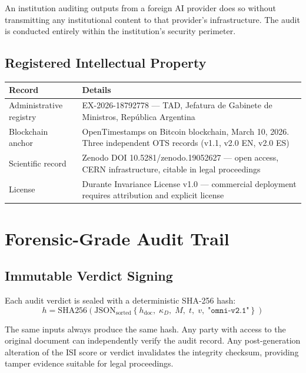 \documentclass[11pt, a4paper]{article}
\begin{document}
An institution auditing outputs from a foreign AI provider does so without
transmitting any institutional content to that provider's infrastructure.
The audit is conducted entirely within the institution's security perimeter.

\subsection{Registered Intellectual Property}

\begin{solidbox}
\begin{tabularx}{\linewidth}{lX}
\toprule
\textbf{Record} & \textbf{Details} \\
\midrule
Administrative registry & EX-2026-18792778 --- TAD, Jefatura de Gabinete de
  Ministros, Rep\'{u}blica Argentina \\
Blockchain anchor & OpenTimestamps on Bitcoin blockchain, March 10, 2026.
  Three independent OTS records (v1.1, v2.0 EN, v2.0 ES) \\
Scientific record & Zenodo DOI 10.5281/zenodo.19052627 --- open access,
  CERN infrastructure, citable in legal proceedings \\
License & Durante Invariance License v1.0 --- commercial deployment requires
  attribution and explicit license \\
\bottomrule
\end{tabularx}
\end{solidbox}

\section{Forensic-Grade Audit Trail}

\subsection{Immutable Verdict Signing}

Each audit verdict is sealed with a deterministic SHA-256 hash:
\[
h = \mathrm{SHA256}\!\left(
  \mathrm{JSON}_{\mathrm{sorted}}\!\left\{
    h_{\text{doc}},\; \kappa_D,\; M,\; t,\; v,\; \texttt{"omni-v2.1"}
  \right\}
\right)
\]

The same inputs always produce the same hash. Any party with access to the
original document can independently verify the audit record. Any post-generation
alteration of the ISI score or verdict invalidates the integrity checksum,
providing tamper evidence suitable for legal proceedings.
\end{document}
